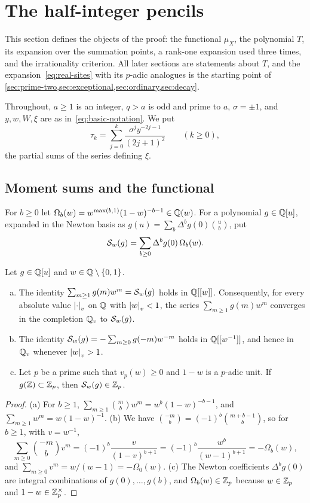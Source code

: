\section{The half-integer pencils}\label{sec:pencils}

This section defines the objects of the proof: the functional $\mu_X$, the polynomial $T$, its
expansion over the summation points, a rank-one expansion used three times, and the
irrationality criterion. All later sections are
statements about $T$, and the expansion~\eqref{eq:real-sites} with its $p$-adic analogues is the
starting point of \cref{sec:prime-two,sec:exceptional,sec:ordinary,sec:decay}.

Throughout, $a\ge1$ is an integer, $q>a$ is odd and prime to $a$, $\sigma=\pm1$, and
$y,w,W,\xi$ are as in~\eqref{eq:basic-notation}. We put
\begin{equation}\label{eq:tau}
  \tau_k=\sum_{j=0}^{k}\frac{\sigma^jy^{-2j-1}}{(2j+1)^2}\qquad(k\ge0),
\end{equation}
the partial sums of the series defining $\xi$.

\subsection{Moment sums and the functional}\label{subsec:moment-sums}

For $b\ge0$ let $\Omega_b(w)=w^{\max(b,1)}(1-w)^{-b-1}\in\mathbb{Q}(w)$. For a polynomial $g\in\mathbb{Q}[u]$,
expanded in the Newton basis as $g(u)=\sum_b\Delta^bg(0)\binom ub$, put
\[
  \mathcal{S}_w(g)=\sum_{b\ge0}\Delta^bg(0)\,\Omega_b(w).
\]

\begin{lemma}\label{lem:moment-sums}
Let $g\in\mathbb{Q}[u]$ and $w\in\mathbb{Q}\setminus\{0,1\}$.
\begin{enumerate}[(a)]
\item The identity $\sum_{m\ge1}g(m)w^m=\mathcal{S}_w(g)$ holds in $\mathbb{Q}[[w]]$. Consequently, for every
absolute value $\left\lvert \cdot\right\rvert_v$ on $\mathbb{Q}$ with $\left\lvert w\right\rvert_v<1$, the series $\sum_{m\ge1}g(m)w^m$
converges in the completion $\mathbb{Q}_v$ to $\mathcal{S}_w(g)$.
\item The identity $\mathcal{S}_w(g)=-\sum_{m\ge0}g(-m)w^{-m}$ holds in $\mathbb{Q}[[w^{-1}]]$, and hence in
$\mathbb{Q}_v$ whenever $\left\lvert w\right\rvert_v>1$.
\item Let $p$ be a prime such that $v_p(w)\ge0$ and $1-w$ is a $p$-adic unit. If
$g(\mathbb{Z})\subset\mathbb{Z}_p$, then $\mathcal{S}_w(g)\in\mathbb{Z}_p$.
\end{enumerate}
\end{lemma}

\begin{proof}
(a) For $b\ge1$, $\sum_{m\ge1}\binom mbw^m=w^b(1-w)^{-b-1}$, and $\sum_{m\ge1}w^m=w(1-w)^{-1}$.
(b) We have $\binom{-m}{b}=(-1)^b\binom{m+b-1}{b}$, so for $b\ge1$, with $v=w^{-1}$,
\[
 \sum_{m\ge0}\binom{-m}bv^m=(-1)^b\frac{v}{(1-v)^{b+1}}=(-1)^b\frac{w^{b}}{(w-1)^{b+1}}
 =-\Omega_b(w),
\]
and $\sum_{m\ge0}v^m=w/(w-1)=-\Omega_0(w)$. (c) The Newton coefficients $\Delta^bg(0)$ are
integral combinations of $g(0),\dots,g(b)$, and $\Omega_b(w)\in\mathbb{Z}_p$ because $w\in\mathbb{Z}_p$ and
$1-w\in\mathbb{Z}_p^\times$.
\end{proof}

